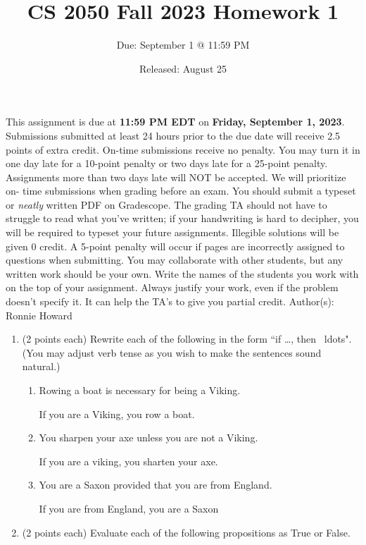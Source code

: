 \documentclass[11pt]{article}
\title{CS 2050 Fall 2023 Homework 1}
\author{Due: September 1 @ 11:59 PM}
\date{Released: August 25}
\newcommand{\pte}[1]{\textcolor{maincolor}{(#1 points each)}}
\begin{document}
\maketitle
\begin{justify}
This assignment is due at \textbf{11:59 PM EDT} on \textbf{Friday, September 1,
2023}. Submissions submitted at least 24 hours prior to the due date will receive
2.5 points of extra credit. On-time submissions receive no penalty. You may turn it
in one day late for a 10-point penalty or two days late for a 25-point penalty.
Assignments more than two days late will NOT be accepted. We will prioritize on-
time submissions when grading before an exam.
\bigskip
You should submit a typeset or \emph{neatly} written PDF on Gradescope. The
grading TA should not have to struggle to read what you've written; if your
handwriting is hard to decipher, you will be required to typeset your future
assignments. Illegible solutions will be given 0 credit. A 5-point penalty will
occur if pages are incorrectly assigned to questions when submitting.
\bigskip
You may collaborate with other students, but any written work should be your own.
Write the names of the students you work with on the top of your assignment.
\bigskip
Always justify your work, even if the problem doesn't specify it. It can help the
TA's to give you partial credit.
\bigskip
Author(s): Ronnie Howard
\clearpage
\begin{enumerate}
\item \pte{2} Rewrite each of the following in the form ``if \ldots, then \
ldots". (You may adjust verb tense as you wish to make the sentences sound
natural.)
\begin{enumerate}
\item Rowing a boat is necessary for being a Viking.
\begin{mdframed}
    If you are a Viking, you row a boat.
\end{mdframed}
\item You sharpen your axe unless you are not a Viking.
\begin{mdframed}
If you are a viking, you sharten your axe.
\end{mdframed}
\item You are a Saxon provided that you are from England.
\begin{mdframed}
If you are from England, you are a Saxon
\end{mdframed}
\end{enumerate}
\item \pte{2} Evaluate each of the following propositions as True or False.

\end{enumerate}
\end{justify}
\end{document}
